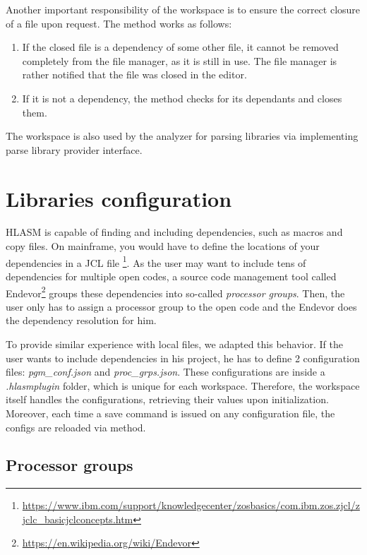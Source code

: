 Another important responsibility of the workspace is to ensure the correct closure of a file upon  request. The method works as follows:

\begin{enumerate}
	\item If the closed file is a dependency of some other file, it cannot be removed completely from the file manager, as it is still in use. The file manager is rather notified that the file was closed in the editor.
	\item If it is not a dependency, the method checks for its dependants and closes them. 
\end{enumerate}                        

The workspace is also used by the analyzer for parsing libraries via implementing parse library provider interface. 

\section{Libraries configuration}
\label{libs_config}
HLASM is capable of finding and including dependencies, such as macros and copy files. On mainframe, you would have to define the locations of your dependencies in a JCL file \footnote{\url{https://www.ibm.com/support/knowledgecenter/zosbasics/com.ibm.zos.zjcl/zjclc_basicjclconcepts.htm}}. As the user may want to include tens of dependencies for multiple open codes, a source code management tool called Endevor\footnote{\url{https://en.wikipedia.org/wiki/Endevor}} groups these dependencies into so-called \emph{processor groups}. Then, the user only has to assign a processor group to the open code and the Endevor does the dependency resolution for him.

To provide similar experience with local files, we adapted this behavior. If the user wants to include dependencies in his project, he has to define 2 configuration files: \emph{pgm\_conf.json} and \emph{proc\_grps.json}. These configurations are inside a \emph{.hlasmplugin} folder, which is unique for each workspace. Therefore, the workspace itself handles the configurations, retrieving their values upon initialization. Moreover, each time a save command is issued on any configuration file, the configs are reloaded via  method.

\subsection{Processor groups}

